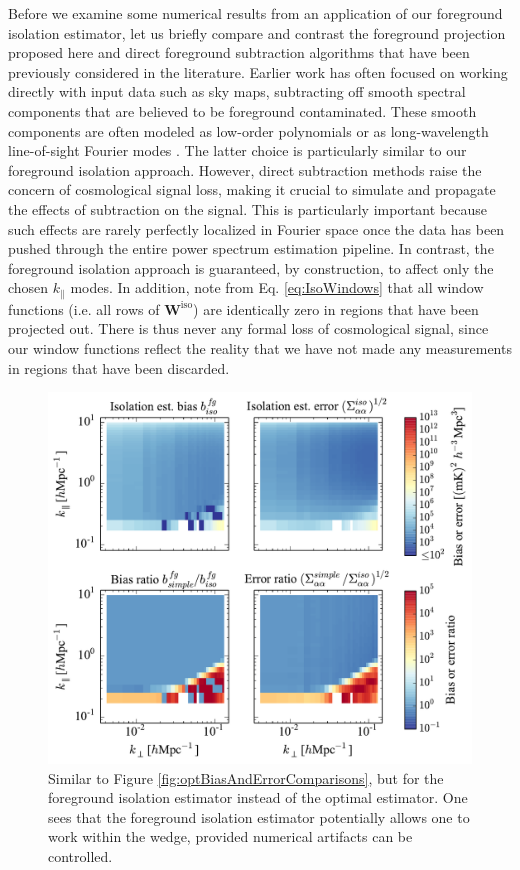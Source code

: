 \documentclass[twocolumn,aps,prd,nofootinbib,showpacs]{revtex4-1}
\begin{document}
Before we examine some numerical results from an application of our foreground isolation estimator, let us briefly compare and contrast the foreground projection proposed here and direct foreground subtraction algorithms that have been previously considered in the literature.  Earlier work has often focused on working directly with input data such as sky maps, subtracting off smooth spectral components that are believed to be foreground contaminated.  These smooth components are often modeled as low-order polynomials \cite{Wang2006,Liu2009a,Bowman2009,Liu2009b} or as long-wavelength line-of-sight Fourier modes \cite{Petrovic2011}.  The latter choice is particularly similar to our foreground isolation approach.  However, direct subtraction methods raise the concern of cosmological signal loss, making it crucial to simulate and propagate the effects of subtraction on the signal.  This is particularly important because such effects are rarely perfectly localized in Fourier space once the data has been pushed through the entire power spectrum estimation pipeline.  In contrast, the foreground isolation approach is guaranteed, by construction, to affect only the chosen $k_\parallel$ modes.  In addition, note from Eq. \eqref{eq:IsoWindows} that all window functions (i.e. all rows of $\mathbf{W}^\textrm{iso}$) are identically zero in regions that have been projected out.  There is thus never any formal loss of cosmological signal, since our window functions reflect the reality that we have not made any measurements in regions that have been discarded.

\begin{figure}[!ht] 
	\centering 
	\includegraphics[width=1.\textwidth]{figures/isolationBiasAndErrorComparisons.pdf}
	\caption{Similar to Figure \ref{fig:optBiasAndErrorComparisons}, but for the foreground isolation estimator instead of the optimal estimator.  One sees that the foreground isolation estimator potentially allows one to work within the wedge, provided numerical artifacts can be controlled.}
	\label{fig:isolationBiasAndErrorComparisons}
\end{figure} 
\end{document}
